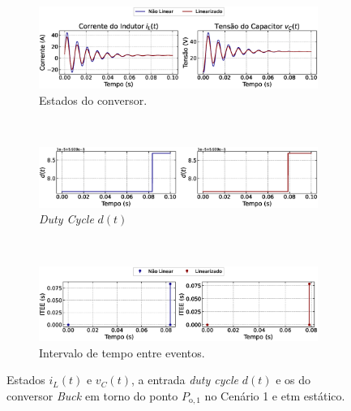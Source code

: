 \begin{figure}[H]
  \centering
  \captionsetup{justification=centering}
  \begin{subfigure}{1.\textwidth}
    \centering
    \includegraphics[width=1.\textwidth]{figuras/static-etm/buck/sim1/op1/result.eps}
    \caption{Estados do conversor.}
    \label{fig:buck_converter_constant_pcpl_static_etm_op1_duty_a}
  \end{subfigure}
  \\[6pt]
  \begin{subfigure}{1.\textwidth}
    \centering
    \includegraphics[width=1.\textwidth]{figuras/static-etm/buck/sim1/op1/duty-cycle.eps}
    \caption{\textit{Duty Cycle} $d(t)$}
    \label{fig:buck_converter_constant_pcpl_static_etm_op1_duty_b}
  \end{subfigure}
  \\[6pt]
  \begin{subfigure}{1.\textwidth}
    \centering
    \includegraphics[width=1.\textwidth]{figuras/static-etm/buck/sim1/op1/inter-event-times.eps}
    \caption{Intervalo de tempo entre eventos.}
    \label{fig:buck_converter_constant_pcpl_static_etm_op1_duty_c}
  \end{subfigure}
  \caption{Estados $i_L(t)$ e $v_C(t)$, a entrada \textit{duty cycle} $d(t)$ e os  do conversor \textit{Buck} em torno do ponto $P_{\mathrm{o}, 1}$ no Cenário 1  e \acrshort{etm} estático.}
\end{figure}

